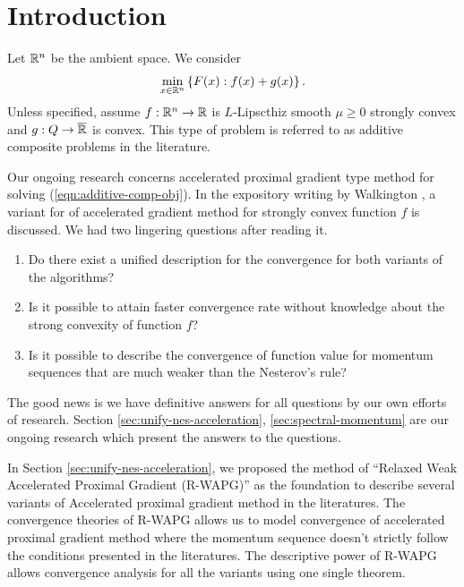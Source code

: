 \documentclass[12pt]{article}
\begin{document}
\section{Introduction}
    Let $\mathbb R^n$ be the ambient space. We consider 
    \begin{align}
        \min_{x \in \mathbb R^n} \left\lbrace
            F(x): f(x) + g(x)
        \right\rbrace.
    \end{align}\label{eqn:additive-comp-obj}
    Unless specified, assume $f:\mathbb R^n \rightarrow \mathbb R$ is $L$-Lipscthiz smooth $\mu \ge 0$ strongly convex and $g:Q \rightarrow \overline {\mathbb R}$ is convex. 
    This type of problem is referred to as additive composite problems in the literature. 
    \par
    Our ongoing research concerns accelerated proximal gradient type method for solving (\ref{eqn:additive-comp-obj}). 
    In the expository writing by Walkington \cite{noel_nesterovs_nodate}, a variant for of accelerated gradient method for strongly convex function $f$ is discussed. 
    We had two lingering questions after reading it. 
    \begin{enumerate}
        \item Do there exist a unified description for the convergence for both variants of the algorithms?
        \item Is it possible to attain faster convergence rate without knowledge about the strong convexity of function $f$?
        \item Is it possible to describe the convergence of function value for momentum sequences that are much weaker than the Nesterov's rule? 
    \end{enumerate}
    The good news is we have definitive answers for all questions by our own efforts of research. 
    Section \ref{sec:unify-nes-acceleration}, \ref{sec:spectral-momentum} are our ongoing research which present the answers to the questions. 
    \par
    In Section \ref{sec:unify-nes-acceleration}, we proposed the method of ``Relaxed Weak Accelerated Proximal Gradient (R-WAPG)'' as the foundation to describe several variants of Accelerated proximal gradient method in the literatures. 
    The convergence theories of R-WAPG allows us to model convergence of accelerated proximal gradient method where the momentum sequence doesn't strictly follow the conditions presented in the literatures. 
    The descriptive power of R-WAPG allows convergence analysis for all the variants using one single theorem. 
    \par
\end{document}
